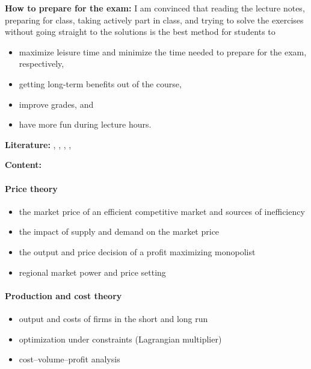 \documentclass[
  12pt,
  oneside]{book}
\providecommand{\tightlist}{%
  \setlength{\itemsep}{0pt}\setlength{\parskip}{0pt}}
\theoremstyle{definition}
\theoremstyle{definition}
\theoremstyle{definition}
\theoremstyle{definition}
\theoremstyle{remark}
\begin{document}
\textbf{How to prepare for the exam:}
I am convinced that reading the lecture notes, preparing for class, taking actively part in class, and trying to solve the exercises without going straight to the solutions is the best method for students to

\begin{itemize}
\tightlist
\item
  maximize leisure time and minimize the time needed to prepare for the exam, respectively,
\item
  getting long-term benefits out of the course,
\item
  improve grades, and
\item
  have more fun during lecture hours.
\end{itemize}

\textbf{Literature:}
\citet{Bazerman2017Judgement}, \citet{Hoover2020Introduction}, \citet{Parkin2017Economics}, \citet{Wilkinson2022Managerial}, \citet{Bonanno2017Decision}

\textbf{Content:}

\paragraph*{Price theory}\label{price-theory}

\begin{itemize}
\tightlist
\item
  the market price of an efficient competitive market and sources of inefficiency
\item
  the impact of supply and demand on the market price
\item
  the output and price decision of a profit maximizing monopolist
\item
  regional market power and price setting
\end{itemize}

\paragraph*{Production and cost theory}\label{production-and-cost-theory}

\begin{itemize}
\tightlist
\item
  output and costs of firms in the short and long run
\item
  optimization under constraints (Lagrangian multiplier)
\item
  cost--volume--profit analysis
\end{itemize}
\end{document}
